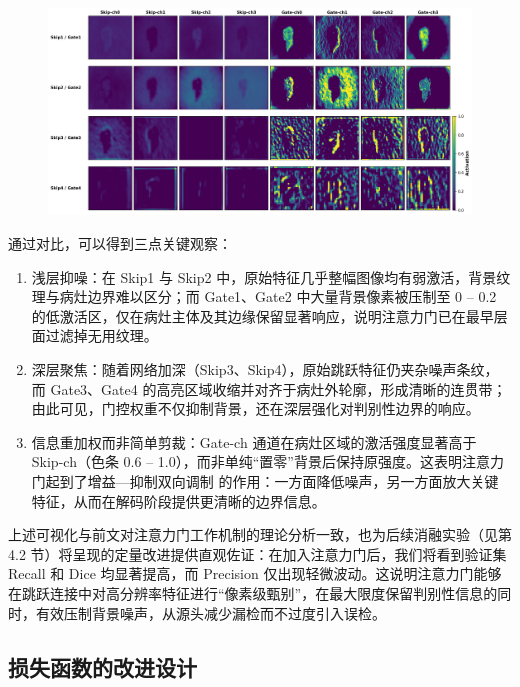 \begin{figure}[!htbp]
    \centering
    \includegraphics[width=\textwidth]{fig/unet_vs_attunet_feature_compare.png}
    \caption{}
    \label{fig:skip_vs_gate_vis}
\end{figure}

通过对比，可以得到三点关键观察：

\begin{enumerate}
    \item 浅层抑噪：在 Skip1 与 Skip2 中，原始特征几乎整幅图像均有弱激活，背景纹理与病灶边界难以区分；而 Gate1、Gate2 中大量背景像素被压制至 0 – 0.2 的低激活区，仅在病灶主体及其边缘保留显著响应，说明注意力门已在最早层面过滤掉无用纹理。
    
    \item 深层聚焦：随着网络加深（Skip3、Skip4），原始跳跃特征仍夹杂噪声条纹，而 Gate3、Gate4 的高亮区域收缩并对齐于病灶外轮廓，形成清晰的连贯带；由此可见，门控权重不仅抑制背景，还在深层强化对判别性边界的响应。
    
    \item 信息重加权而非简单剪裁：Gate-ch 通道在病灶区域的激活强度显著高于 Skip-ch（色条 0.6 – 1.0），而非单纯“置零”背景后保持原强度。这表明注意力门起到了增益—抑制双向调制 的作用：一方面降低噪声，另一方面放大关键特征，从而在解码阶段提供更清晰的边界信息。
\end{enumerate}

上述可视化与前文对注意力门工作机制的理论分析一致，也为后续消融实验（见第 4.2 节）将呈现的定量改进提供直观佐证：在加入注意力门后，我们将看到验证集 Recall 和 Dice 均显著提高，而 Precision 仅出现轻微波动。这说明注意力门能够在跳跃连接中对高分辨率特征进行“像素级甄别”，在最大限度保留判别性信息的同时，有效压制背景噪声，从源头减少漏检而不过度引入误检。

\subsection{损失函数的改进设计}

